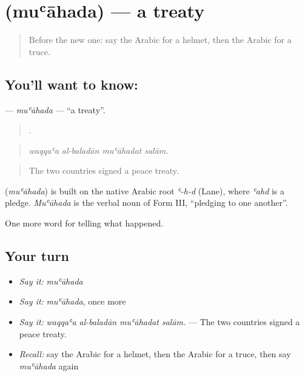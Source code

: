 \section[\texorpdfstring{\ar{معاهدة} (muʿāhada)}{معاهدة (muʿāhada)}]{ (muʿāhada) — a treaty}

\label{lesson:AR-C341-muahada}



\begin{quote}
Before the new one: say the Arabic for a helmet, then the Arabic for a truce.
\end{quote}

\subsection*{You'll want to know: }
\textbf{} — \emph{muʿāhada} — \textquotedblleft{}a treaty\textquotedblright{}.

\begin{quote}
   .
\end{quote}

\begin{quote}
\emph{waqqaʿa al-baladān muʿāhadat salām.}
\end{quote}

\begin{quote}
The two countries signed a peace treaty.
\end{quote}

\begin{cousinweb}
\textbf{} (\emph{muʿāhada}) is built on the native Arabic root \emph{ʿ-h-d} (Lane), where \emph{ʿahd} is a pledge. \emph{Muʿāhada} is the verbal noun of Form III, \textquotedblleft{}pledging to one another\textquotedblright{}.
\end{cousinweb}

\begin{grammarlens}[title={What you've built}]
One more word for telling what happened.
\end{grammarlens}

\subsection*{Your turn}
\begin{itemize}
\raggedright
  \item \emph{Say it:} \emph{muʿāhada}
  \item \emph{Say it:} \emph{muʿāhada}, once more
  \item \emph{Say it:} \emph{waqqaʿa al-baladān muʿāhadat salām.} — The two countries signed a peace treaty.
  \item \emph{Recall:} say the Arabic for a helmet, then the Arabic for a truce, then say \emph{muʿāhada} again
\end{itemize}

